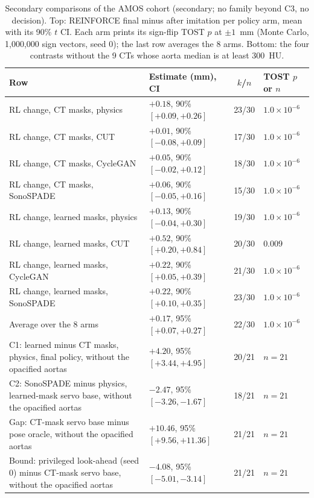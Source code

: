 
\begin{table}[tp]
\renewcommand{\baselinestretch}{1}\scriptsize
\caption{Secondary comparisons of the AMOS cohort (secondary; no family beyond C3, no decision). Top: REINFORCE final minus after imitation per policy arm, mean with its 90\% $t$ CI. Each arm prints its sign-flip TOST $p$ at $\pm 1$~mm (Monte Carlo, 1,000,000 sign vectors, seed 0); the last row averages the 8 arms. Bottom: the four contrasts without the 9 CTs whose aorta median is at least 300~HU.}
\label{tab:s11-amos-secondary}
\centering
\setlength{\tabcolsep}{3pt}
\begin{tabularx}{\textwidth}{@{}>{\raggedright\arraybackslash}X l c l@{}}
\toprule
Row & Estimate (mm), CI & $k$/$n$ & TOST $p$ or $n$ \\
\midrule
\quad RL change, CT masks, physics & $+0.18$, 90\% $[+0.09, +0.26]$ & 23/30 & $1.0 \times 10^{-6}$ \\
\quad RL change, CT masks, CUT & $+0.01$, 90\% $[-0.08, +0.09]$ & 17/30 & $1.0 \times 10^{-6}$ \\
\quad RL change, CT masks, CycleGAN & $+0.05$, 90\% $[-0.02, +0.12]$ & 18/30 & $1.0 \times 10^{-6}$ \\
\quad RL change, CT masks, SonoSPADE & $+0.06$, 90\% $[-0.05, +0.16]$ & 15/30 & $1.0 \times 10^{-6}$ \\
\quad RL change, learned masks, physics & $+0.13$, 90\% $[-0.04, +0.30]$ & 19/30 & $1.0 \times 10^{-6}$ \\
\quad RL change, learned masks, CUT & $+0.52$, 90\% $[+0.20, +0.84]$ & 20/30 & $0.009$ \\
\quad RL change, learned masks, CycleGAN & $+0.22$, 90\% $[+0.05, +0.39]$ & 21/30 & $1.0 \times 10^{-6}$ \\
\quad RL change, learned masks, SonoSPADE & $+0.22$, 90\% $[+0.10, +0.35]$ & 23/30 & $1.0 \times 10^{-6}$ \\
\quad Average over the 8 arms & $+0.17$, 95\% $[+0.07, +0.27]$ & 22/30 & $1.0 \times 10^{-6}$ \\
\addlinespace
\quad C1: learned minus CT masks, physics, final policy, without the opacified aortas & $+4.20$, 95\% $[+3.44, +4.95]$ & 20/21 & $n = 21$ \\
\quad C2: SonoSPADE minus physics, learned-mask servo base, without the opacified aortas & $-2.47$, 95\% $[-3.26, -1.67]$ & 18/21 & $n = 21$ \\
\quad Gap: CT-mask servo base minus pose oracle, without the opacified aortas & $+10.46$, 95\% $[+9.56, +11.36]$ & 21/21 & $n = 21$ \\
\quad Bound: privileged look-ahead (seed 0) minus CT-mask servo base, without the opacified aortas & $-4.08$, 95\% $[-5.01, -3.14]$ & 21/21 & $n = 21$ \\
\bottomrule
\end{tabularx}
\end{table}
